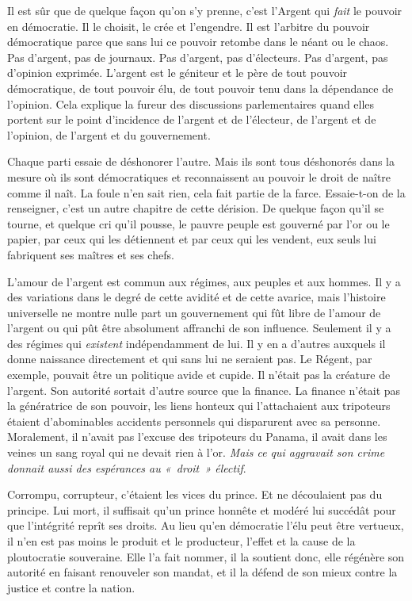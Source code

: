 \documentclass[french,twoside]{book} %
\begin{document}
\noindent Il est sûr que de quelque façon qu’on s’y prenne, c’est l’Argent qui \emph{fait} le pouvoir en démocratie. Il le choisit, le crée et l’engendre. Il est l’arbitre du pouvoir démocratique parce que sans lui ce pouvoir retombe dans le néant ou le chaos. Pas d’argent, pas de journaux. Pas d’argent, pas d’électeurs. Pas d’argent, pas d’opinion exprimée. L’argent est le géniteur et le père de tout pouvoir démocratique, de tout pouvoir élu, de tout pouvoir tenu dans la dépendance de l’opinion. Cela explique la fureur des discussions parlementaires quand elles portent sur le point d’incidence de l’argent et de l’électeur, de l’argent et de l’opinion, de l’argent et du gouvernement.\par
Chaque parti essaie de déshonorer l’autre. Mais ils sont tous déshonorés dans la mesure où ils sont démocratiques et reconnaissent au pouvoir le droit de naître comme il naît. La foule n’en sait rien, cela fait partie de la farce. Essaie-t-on de la renseigner, c’est un autre chapitre de cette dérision. De quelque façon qu’il se tourne, et quelque cri qu’il pousse, le pauvre peuple est gouverné par l’or ou le papier, par ceux qui les détiennent et par ceux qui les vendent, eux seuls lui fabriquent ses maîtres et ses chefs.\par
L’amour de l’argent est commun aux régimes, aux peuples et aux hommes. Il y a des variations dans le degré de cette avidité et de cette avarice, mais l’histoire universelle ne montre nulle part un gouvernement qui fût libre de l’amour de l’argent ou qui pût être absolument affranchi de son influence. Seulement il y a des régimes qui \emph{existent} indépendamment de lui. Il y en a d’autres auxquels il donne naissance directement et qui sans lui ne seraient pas. Le Régent, par exemple, pouvait être un politique avide et cupide. Il n’était pas la créature de l’argent. Son autorité sortait d’autre source que la finance. La finance n’était pas la génératrice de son pouvoir, les liens honteux qui l’attachaient aux tripoteurs étaient d’abominables accidents personnels qui disparurent avec sa personne. Moralement, il n’avait pas l’excuse des tripoteurs du Panama, il avait dans les veines un sang royal qui ne devait rien à l’or. \emph{Mais ce qui aggravait son crime donnait aussi des espérances au « droit » électif}.\par
Corrompu, corrupteur, c’étaient les vices du prince. Et ne découlaient pas du principe. Lui mort, il suffisait qu’un prince honnête et modéré lui succédât pour que l’intégrité reprît ses droits. Au lieu qu’en démocratie l’élu peut être vertueux, il n’en est pas moins le produit et le producteur, l’effet et la cause de la ploutocratie souveraine. Elle l’a fait nommer, il la soutient donc, elle régénère son autorité en faisant renouveler son mandat, et il la défend de son mieux contre la justice et contre la nation.\par
\end{document}
